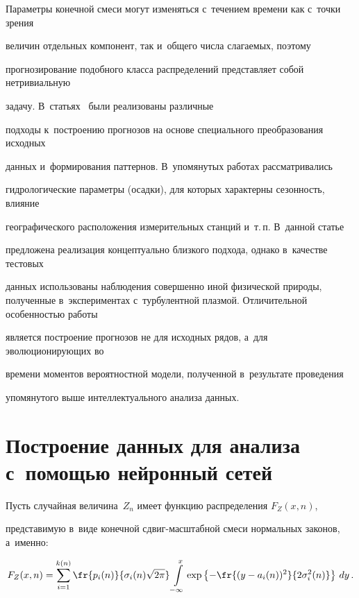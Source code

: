 Параметры конечной смеси могут изменяться с~течением времени как с~точки зрения 


величин отдельных компонент, так и~общего числа слагаемых, поэтому 


прогнозирование подобного класса распределений представляет собой нетривиальную 


задачу. В~статьях~\cite{Gorshenin2017a,Gorshenin2018} были реализованы различные 


подходы к~построению прогнозов на основе специального преобразования исходных 


данных и~формирования паттернов. В~упомянутых работах рассматривались 


гидрологические параметры (осадки), для которых характерны сезонность, влияние 


географического расположения измерительных станций и~т.\,п. В~данной \mbox{статье} 


предложена реализация концептуально близкого подхода, однако в~качестве тестовых 


данных использованы наблюдения совершенно иной физической природы, полученные в~экспериментах с~турбулентной плазмой. Отличительной особенностью работы 


является построение прогнозов не для исходных рядов, а~для эволюционирующих во 


времени моментов вероятностной модели, полученной в~результате проведения 


упомянутого выше интеллектуального анализа данных.





\section{Построение данных для анализа с~помощью нейронный сетей}





Пусть случайная величина~$Z_n$ имеет функцию распределения $F_Z(x,n)$, 


представимую в~виде конечной сдвиг-масштабной смеси нормальных законов, а~\mbox{именно}:


\begin{equation}


\label{Mixture}


F_Z(x,n)=\sum\limits_{i=1}^{k(n)}


\fr{p_i(n)}{\sigma_i(n)\sqrt{2\pi}}\int\limits_{-\infty}^{x}


\exp\left\{-\fr{(y-a_i(n))^2}


{2\sigma_i^2(n)}\right\}\,dy\,.


\end{equation}


